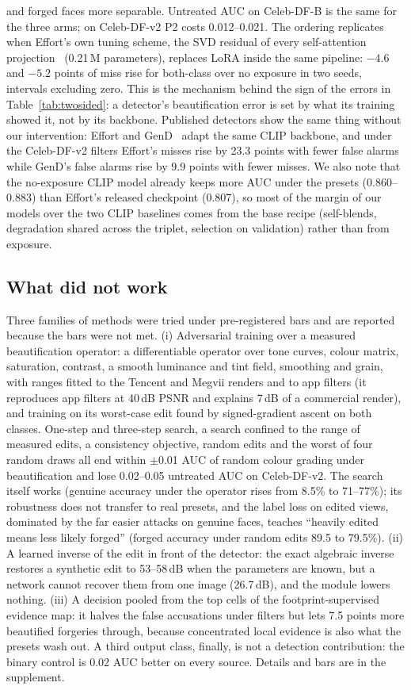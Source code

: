 \documentclass[conference]{IEEEtran}
\begin{document}
and forged faces more separable. Untreated AUC on Celeb-DF-B is the same for the three arms; on Celeb-DF-v2 P2 costs
0.012--0.021. The ordering replicates when Effort's own tuning scheme, the SVD residual of every self-attention
projection~\cite{effort} (0.21\,M parameters), replaces LoRA inside the same pipeline: $-4.6$ and $-5.2$ points of miss
rise for both-class over no exposure in two seeds, intervals excluding zero. This is the mechanism behind the sign of
the errors in Table~\ref{tab:twosided}: a detector's beautification error is set by what its training showed it, not by
its backbone. Published detectors show the same thing without our intervention: Effort and GenD~\cite{gend2026} adapt the
same CLIP backbone, and under the Celeb-DF-v2 filters Effort's misses rise by 23.3 points with fewer false alarms while
GenD's false alarms rise by 9.9 points with fewer misses. We also note that the no-exposure CLIP model already keeps more AUC under the presets (0.860--0.883) than
Effort's released checkpoint (0.807), so most of the margin of our models over the two CLIP baselines comes from the base
recipe (self-blends, degradation shared across the triplet, selection on validation) rather than from exposure.

\subsection{What did not work}
\label{sec:negative}
Three families of methods were tried under pre-registered bars and are reported because the bars were not met. (i)
Adversarial training over a measured beautification operator: a differentiable operator over tone curves, colour matrix,
saturation, contrast, a smooth luminance and tint field, smoothing and grain, with ranges fitted to the Tencent and Megvii
renders and to app filters (it reproduces app filters at 40\,dB PSNR and explains 7\,dB of a commercial render), and
training on its worst-case edit found by signed-gradient ascent on both classes. One-step and three-step search, a
search confined to the range of measured edits, a consistency objective, random edits and the worst of four random draws
all end within $\pm$0.01 AUC of random colour grading under beautification and lose 0.02--0.05 untreated AUC on
Celeb-DF-v2. The search itself works (genuine accuracy under the operator rises from 8.5\% to 71--77\%); its robustness
does not transfer to real presets, and the label loss on edited views, dominated by the far easier attacks on genuine
faces, teaches ``heavily edited means less likely forged'' (forged accuracy under random edits 89.5 to 79.5\%). (ii) A
learned inverse of the edit in front of the detector: the exact algebraic inverse restores a synthetic edit to 53--58\,dB
when the parameters are known, but a network cannot recover them from one image (26.7\,dB), and the module lowers
nothing. (iii) A decision pooled from the top cells of the footprint-supervised evidence map: it halves the false
accusations under filters but lets 7.5 points more beautified forgeries through, because concentrated local evidence is
also what the presets wash out. A third output class, finally, is not a detection contribution: the binary control is
0.02 AUC better on every source. Details and bars are in the supplement.
\end{document}
